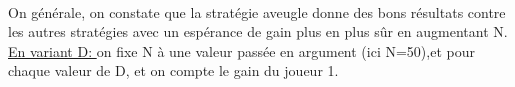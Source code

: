 \documentclass{article}
\begin{document}
\begin{large}
        \qquad
         \\[1.5em]
    
        On générale, on constate que la stratégie aveugle donne des bons résultats contre les autres 
        stratégies avec un espérance de gain plus en plus sûr en augmentant N. \\
    
        \underline{En variant D: } on fixe N à une valeur passée en argument (ici N=50),et pour 
        chaque valeur de D, et on compte le gain du joueur 1.\\
      

\end{large}
\end{document}

